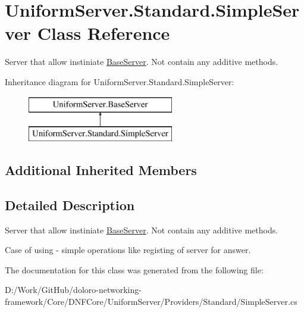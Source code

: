 \hypertarget{class_uniform_server_1_1_standard_1_1_simple_server}{}\section{Uniform\+Server.\+Standard.\+Simple\+Server Class Reference}
\label{class_uniform_server_1_1_standard_1_1_simple_server}


Server that allow instiniate \mbox{\hyperlink{class_uniform_server_1_1_base_server}{Base\+Server}}. Not contain any additive methods.  


Inheritance diagram for Uniform\+Server.\+Standard.\+Simple\+Server\+:\begin{figure}[H]
\begin{center}
\leavevmode
\includegraphics[height=2.000000cm]{db/daa/class_uniform_server_1_1_standard_1_1_simple_server}
\end{center}
\end{figure}
\subsection*{Additional Inherited Members}


\subsection{Detailed Description}
Server that allow instiniate \mbox{\hyperlink{class_uniform_server_1_1_base_server}{Base\+Server}}. Not contain any additive methods. 

Case of using -\/ simple operations like registing of server for answer. 

The documentation for this class was generated from the following file\+:\begin{DoxyCompactItemize}
\item 
D\+:/\+Work/\+Git\+Hub/doloro-\/networking-\/framework/\+Core/\+D\+N\+F\+Core/\+Uniform\+Server/\+Providers/\+Standard/Simple\+Server.\+cs\end{DoxyCompactItemize}
